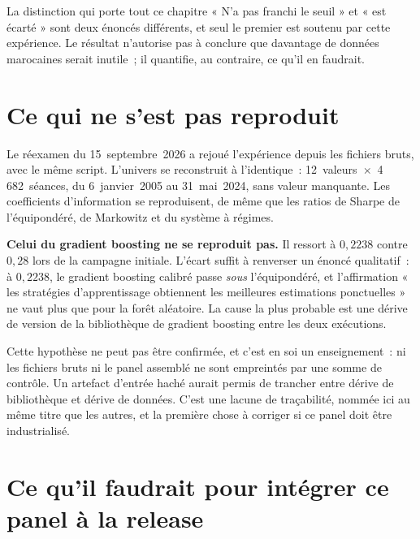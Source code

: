 \begin{resultatbox}{La distinction qui porte tout ce chapitre}
« N'a pas franchi le seuil » et « est écarté » sont deux énoncés différents, et
seul le premier est soutenu par cette expérience. Le résultat n'autorise pas à
conclure que davantage de données marocaines serait inutile~; il quantifie, au
contraire, ce qu'il en faudrait.
\end{resultatbox}

\section{Ce qui ne s'est pas reproduit}

Le réexamen du 15~septembre~2026 a rejoué l'expérience depuis les fichiers
bruts, avec le même script. L'univers se reconstruit à l'identique~:
12~valeurs~$\times$~4\,682~séances, du 6~janvier~2005 au 31~mai~2024, sans
valeur manquante. Les coefficients d'information se reproduisent, de même que
les ratios de Sharpe de l'équipondéré, de Markowitz et du système à régimes.

\textbf{Celui du gradient boosting ne se reproduit pas.} Il ressort à
$0{,}2238$ contre $0{,}28$ lors de la campagne initiale. L'écart suffit à
renverser un énoncé qualitatif~: à $0{,}2238$, le gradient boosting calibré
passe \emph{sous} l'équipondéré, et l'affirmation « les stratégies
d'apprentissage obtiennent les meilleures estimations ponctuelles » ne vaut plus
que pour la forêt aléatoire. La cause la plus probable est une dérive de version
de la bibliothèque de gradient boosting entre les deux exécutions.

Cette hypothèse ne peut pas être confirmée, et c'est en soi un enseignement~:
ni les fichiers bruts ni le panel assemblé ne sont empreintés par une somme de
contrôle. Un artefact d'entrée haché aurait permis de trancher entre dérive de
bibliothèque et dérive de données. C'est une lacune de traçabilité, nommée ici
au même titre que les autres, et la première chose à corriger si ce panel doit
être industrialisé.

\section{Ce qu'il faudrait pour intégrer ce panel à la release}

